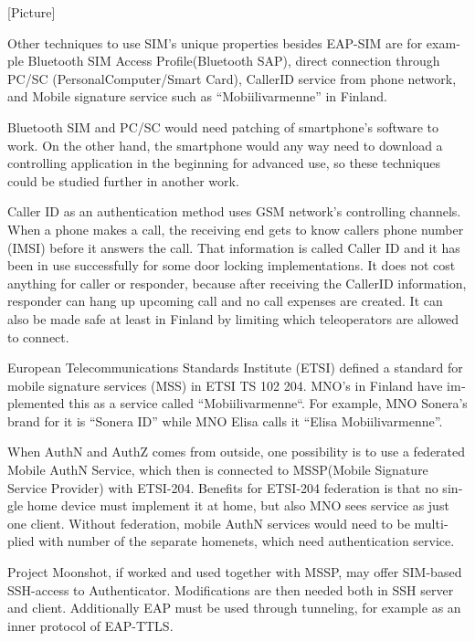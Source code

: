\documentclass[12pt,a4paper,english]{tutthesis}
\begin{document}
\begin{otherlanguage}{english}
[Picture]

Other techniques  to use SIM's unique properties besides EAP-SIM
are for example Bluetooth SIM Access Profile(Bluetooth  SAP), 
direct connection through PC/SC (Personal\-Computer/Smart\- Card),
CallerID service from phone network, and
Mobile signature service such as ``Mobiilivarmenne'' in Finland.



Bluetooth SIM and PC/SC would need patching of smartphone's software
to work.  On the other hand, the smartphone would any way need to
download  a controlling application
in the beginning for advanced use, so these techniques could be
studied further in another work.

Caller ID as an authentication method uses GSM network's controlling
channels. When a phone makes a call, the receiving end gets 
to know callers phone number (IMSI) before it answers the call.
That information is called Caller ID and it has been in use
successfully for some door locking implementations. 
It does not cost anything for caller or responder,
because after receiving the CallerID  information, responder can hang
up upcoming call and no call expenses are created.
 It can also be made safe at least in Finland
by limiting which teleoperators are allowed to connect.
















European Telecommunications Standards Institute (ETSI) defined a
standard for mobile signature services (MSS) in ETSI TS 102 204.
MNO's in Finland have implemented this as a 
service called ``Mobiilivarmenne``. 
For example, MNO Sonera's brand for  it is ``Sonera ID'' while MNO Elisa calls it
``Elisa Mobiilivarmenne''.

When AuthN and AuthZ comes from outside, one possibility is to use a
federated Mobile AuthN Service, which then is connected to MSSP(Mobile
Signature Service Provider) with ETSI-204. Benefits for ETSI-204
federation is that no single home device must implement it at home,
but also MNO sees service as just one client.  Without federation,
mobile AuthN services would need to be multiplied with number of the
separate homenets, which need authentication service.



Project Moonshot, if worked and used together with MSSP, may offer
SIM-based SSH-access to Authenticator. Modifications are then needed 
both in SSH server and client. Additionally EAP must be used through
tunneling, for example as an inner protocol of EAP-TTLS. \cite{moonshot}


\end{otherlanguage}
\end{document}
